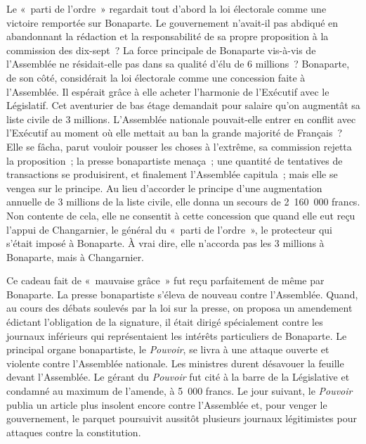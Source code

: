 \documentclass[twoside]{book} %
\begin{document}
Le « parti de l’ordre » regardait tout d’abord la loi électorale comme une victoire remportée sur Bonaparte. Le gouvernement n’avait-il pas abdiqué en abandonnant la rédaction et la responsabilité de sa propre proposition à la commission des dix-sept ? La force principale de Bonaparte vis-à-vis de l’Assemblée ne résidait-elle pas dans sa qualité d’élu de 6 millions ? Bonaparte, de son côté, considérait la loi électorale comme une concession faite à l’Assemblée. Il espérait grâce à elle acheter l’harmonie de l’Exécutif avec le Législatif. Cet aventurier de bas étage demandait pour salaire qu’on augmentât sa liste civile de 3 millions. L’Assemblée nationale pouvait-elle entrer en conflit avec l’Exécutif au moment où elle mettait au ban la grande majorité de Français ? Elle se fâcha, parut vouloir pousser les choses à l’extrême, sa commission rejetta la proposition ; la presse bonapartiste menaça ; une quantité de tentatives de transactions se produisirent, et finalement l’Assemblée capitula ; mais elle se vengea sur le principe. Au lieu d’accorder le principe d’une augmentation annuelle de 3 millions de la liste civile, elle donna un secours de 2 160 000 francs. Non contente de cela, elle ne consentit à cette concession que quand elle eut reçu l’appui de Changarnier, le général du « parti de l’ordre », le protecteur qui s’était imposé à Bonaparte. À vrai dire, elle n’accorda pas les 3 millions à Bonaparte, mais à Changarnier.\par
Ce cadeau fait de « mauvaise grâce » fut reçu parfaitement de même par Bonaparte. La presse bonapartiste s’éleva de nouveau contre l’Assemblée. Quand, au cours des débats soulevés par la loi sur la presse, on proposa un amendement édictant l’obligation de la signature, il était dirigé spécialement contre les journaux inférieurs qui représentaient les intérêts particuliers de Bonaparte. Le principal organe bonapartiste, le \emph{Pouvoir}, se livra à une attaque ouverte et violente contre l’Assemblée nationale. Les ministres durent désavouer la feuille devant l’Assemblée. Le gérant du \emph{Pouvoir} fut cité à la barre de la Législative et condamné au maximum de l’amende, à 5 000 francs. Le jour suivant, le \emph{Pouvoir} publia un article plus insolent encore contre l’Assemblée et, pour venger le gouvernement, le parquet poursuivit aussitôt plusieurs journaux légitimistes pour attaques contre la constitution.\par
\end{document}
